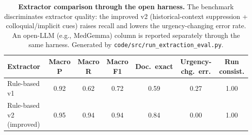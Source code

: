 \begin{table}[htbp]
\centering
\caption{\textbf{Extractor comparison through the open harness.} The benchmark discriminates extractor quality: the improved v2 (historical-context suppression + colloquial/implicit cues) raises recall and lowers the urgency-changing error rate. An open-LLM (e.g., MedGemma) column is reported separately through the same harness. Generated by \texttt{code/src/run\_extraction\_eval.py}.}
\label{tab:extraction_compare}
\small
\begin{tabular}{lcccccc}
\toprule
Extractor & Macro P & Macro R & Macro F1 & Doc.\ exact & Urgency-chg.\ err. & Run consist. \\
\midrule
Rule-based v1 & 0.92 & 0.62 & 0.72 & 0.59 & 0.27 & 1.00 \\
Rule-based v2 (improved) & 0.95 & 0.94 & 0.94 & 0.84 & 0.00 & 1.00 \\
\bottomrule
\end{tabular}
\end{table}
